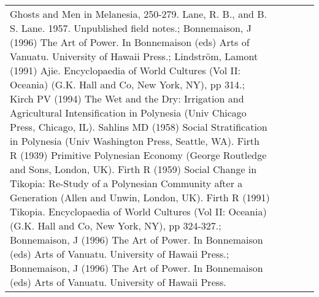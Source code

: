 \begin{table}[ht]
\begin{tabular}{p{5cm}p{2cm}p{2cm}p{2cm}p{2cm}}
Ghosts and Men in Melanesia, 250-279. Lane, R. B., and B. S. Lane. 1957. Unpublished field notes.; Bonnemaison, J (1996) The Art of Power. In Bonnemaison (eds) Arts of Vanuatu. University of Hawaii Press.; Lindström, Lamont (1991) Ajie. Encyclopaedia of World Cultures (Vol II: Oceania) (G.K. Hall and Co, New York, NY), pp 314.; Kirch PV (1994) The Wet and the Dry: Irrigation and Agricultural Intensification in Polynesia (Univ Chicago Press, Chicago, IL). Sahlins MD (1958) Social Stratification in Polynesia (Univ Washington Press, Seattle, WA). Firth R (1939) Primitive Polynesian Economy (George Routledge and Sons, London, UK). Firth R (1959) Social Change in Tikopia: Re-Study of a Polynesian Community after a Generation (Allen and Unwin, London, UK). Firth R (1991) Tikopia. Encyclopaedia of World Cultures (Vol II: Oceania) (G.K. Hall and Co, New York, NY), pp 324-327.; Bonnemaison, J (1996) The Art of Power. In Bonnemaison (eds) Arts of Vanuatu. University of Hawaii Press.; Bonnemaison, J (1996) The Art of Power. In Bonnemaison (eds) Arts of Vanuatu. University of Hawaii Press. \\ 

\end{tabular}
\end{table}
